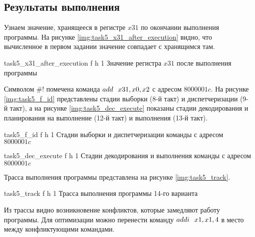 \subsection*{Результаты выполнения}

Узнаем значение, хранящееся в регистре $x31$ по окончании выполнения программы. На рисунке \ref{img:task5_x31_after_execution} видно, что вычисленное в первом задании значение совпадает с хранящимся там.

{task5_x31_after_execution} %
{f} %
{h} %
{1\textwidth} %
{Значение регистра $x31$ после выполнения программы} %


Символом $\#!$ помечена команда $add \hspace{0.25cm} x31, x0, x2$ с адресом $8000001c$. На рисунке \ref{img:task5_f_id} представлены стадии выборки (8-й такт) и диспетчеризации (9-й такт), а на рисунке \ref{img:task5_dec_execute} показаны стадии декодирования и планирования на выполнение (12-й такт) и выполнения (13-й такт).

{task5_f_id} %
{f} %
{h} %
{1\textwidth} %
{Стадии выборки и диспетчеризации команды с адресом $8000001c$} %

\clearpage

{task5_dec_execute} %
{f} %
{h} %
{1\textwidth} %
{Стадии декодирования и выполнения команды с адресом $8000001c$} %

\clearpage 

Трасса выполнения программы представлена на рисунке \ref{img:task5_track}.

{task5_track} %
{f} %
{h} %
{1\textwidth} %
{Трасса выполнения программы 14-го варианта} %

Из трассы видно возникновение конфликтов, которые замедляют работу программы. Для оптимизации можно перенести команду $addi \hspace{0.25cm} x1,x1,4$ в место между конфликтующими командами.

